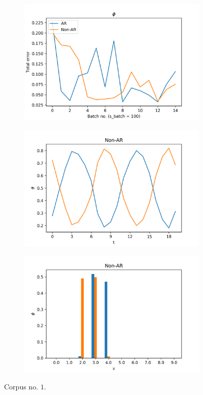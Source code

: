 \documentclass[12pt]{article}
\begin{document}
\begin{figure}[H]
  \begin{subfigure}[b]{0.3\textwidth}
    \includegraphics[width=\linewidth]{performance_phis-1.png}
  \end{subfigure}%
  \begin{subfigure}[b]{0.3\textwidth}
    \includegraphics[width=\linewidth]{latent_thetas_Non-AR_1.png}
  \end{subfigure}%
  \begin{subfigure}[b]{0.3\textwidth}
    \includegraphics[width=\linewidth]{latent_phis_Non-AR_1.png}
  \end{subfigure}%
  \caption{Corpus no. $1$.}
\end{figure}
\end{document}
